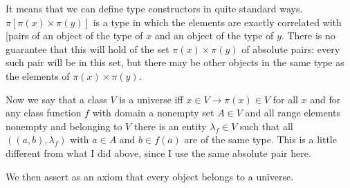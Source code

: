 \documentclass[12pt]{article}
\begin{document}
It means that we can define type constructors in quite standard ways.  $\pi[\pi(x) \times \pi(y)]$ is a type in which the elements are exactly correlated with [pairs of an object of the type of $x$ and an object of the type of $y$.  There is no guarantee that this will hold of the set $\pi(x) \times \pi(y)$ of absolute pairs:  every such pair will be in this set, but there may be other objects in the same type as the elements of $\pi(x) \times \pi(y)$.

Now we say that a class $V$ is a universe iff $x \in V \rightarrow \pi(x) \in V$ for all $x$ and for any class function
$f$ with domain a nonempty set $A \in V$ and all range elements nonempty and belonging to $V$ there is an entity $\lambda_f \in V$ such that all $((a,b),\lambda_f)$ with $a \in A$ and $b \in f(a)$ are of the same type.  This is a little different from what I did above, since I use the same absolute pair here.

We then assert as an axiom that every object belongs to a universe.
\end{document}

